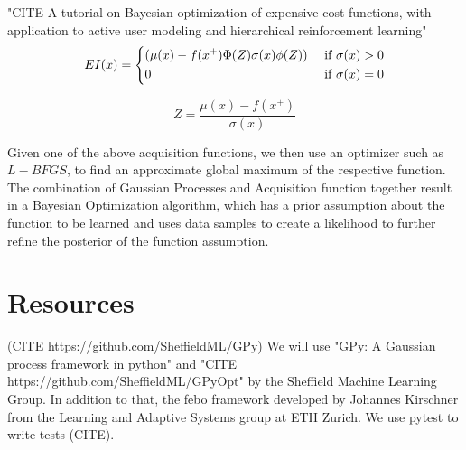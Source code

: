 "CITE A tutorial on Bayesian optimization of expensive cost functions, with application to active user modeling and hierarchical reinforcement learning"
\begin{align}
    EI(x) =
    \begin{dcases}
        ( \mu (x) - f(x^+) \Phi(Z) \sigma (x) \phi (Z) ) & \text{ if } \sigma (x) > 0 \\
        0 & \text{ if } \sigma (x) = 0
    \end{dcases} \\
\end{align}

\begin{equation}
    Z = \frac{\mu (x) - f(x^+) }{\sigma(x)}
\end{equation}

Given one of the above acquisition functions, we then use an optimizer such as $L-BFGS$, to find an approximate global maximum of the respective function.
The combination of Gaussian Processes and Acquisition function together result in a Bayesian Optimization algorithm, which has a prior assumption about the function to be learned and uses data samples to create a likelihood to further refine the posterior of the function assumption.

\section{Resources}
(CITE https://github.com/SheffieldML/GPy)
We will use "GPy: A Gaussian process framework in python" and "CITE https://github.com/SheffieldML/GPyOpt" by the Sheffield Machine Learning Group.
In addition to that, the febo framework developed by Johannes Kirschner from the Learning and Adaptive Systems group at ETH Zurich.
We use pytest to write tests (CITE).

